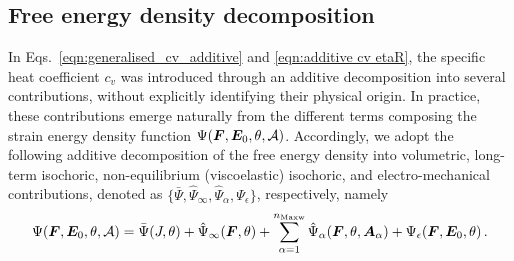 

\subsection{Free energy density decomposition}
\label{sec:free_energy_density_terms}

In Eqs.~\eqref{eqn:generalised_cv_additive} and \eqref{eqn:additive cv etaR}, the specific heat coefficient $c_v$ was introduced through an additive decomposition into several contributions, without explicitly identifying their physical origin. In practice, these contributions emerge naturally from the different terms composing the strain energy density function $\Psi(\boldsymbol{F},\boldsymbol{E}_0,\theta,\mathcal{A})$. Accordingly, we adopt the following additive decomposition of the free energy density into  volumetric, long-term isochoric, non-equilibrium (viscoelastic) isochoric, and electro-mechanical contributions, denoted as $\{\bar\Psi,\hat\Psi_{\infty},\hat\Psi_{\alpha},\Psi_{\epsilon}\}$, respectively, namely
%
\begin{equation} \label{eqn:free_energy_density_additive}
	\Psi(\boldsymbol{F},\boldsymbol{E}_0,\theta,\mathcal{A}) = \bar\Psi(J,\theta) + \hat\Psi_{\infty}(\boldsymbol{F},\theta) + \sum_{\alpha=1}^{n_{\text{Maxw}}}\hat\Psi_{\alpha}(\boldsymbol{F},\theta,\boldsymbol{A}_{\alpha}) + \Psi_{\epsilon}(\boldsymbol{F},\boldsymbol{E}_0,\theta) \,.
\end{equation}



